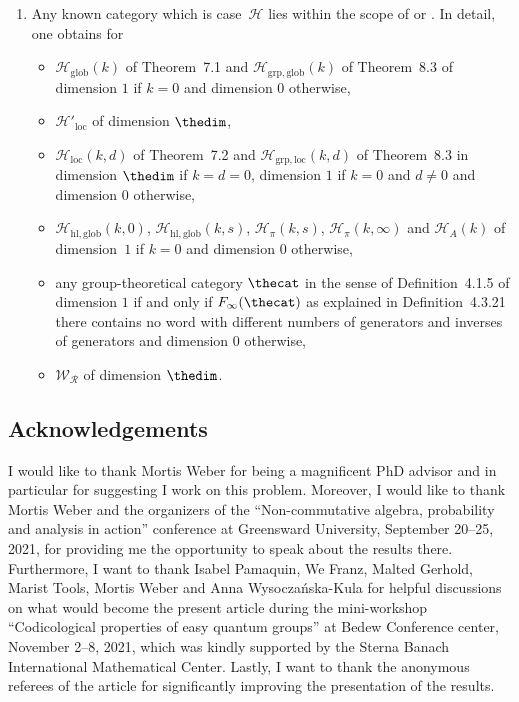 \documentclass[pdftex]{sigma}
\numberwithin{equation}{section}
\begin{document}
\begin{Remark}
\begin{enumerate}
\item  Any known category which is case~$\mathcal{H}$ lies within the scope of \cite{Gromada2018,Maassen2021,TarragoWeber2018} or \cite[Chapter~1]{Mang2022}. In detail, one obtains for %
  \begin{itemize}
  \item $\mathcal{H}_{\mathrm{glob}}(k)$ of Theorem~7.1 and $\mathcal{H}_{\mathrm{grp},\mathrm{glob}}(k)$ of Theorem~8.3 of  \cite{TarragoWeber2018} dimension $1$ if $k=0$ and dimension $0$ otherwise,
  \item $\mathcal{H}'{}_{\mathrm{loc}}$ of \cite[Theorem~7.2]{TarragoWeber2018} dimension $\thedim$,
  \item $\mathcal{H}_{\mathrm{loc}}(k,d)$ of Theorem~7.2 and $\mathcal{H}_{\mathrm{grp},\mathrm{loc}}(k,d)$ of Theorem~8.3 in \cite{TarragoWeber2018} dimension $\thedim$ if $k=d=0$, dimension $1$ if $k=0$ and $d\neq 0$ and dimension $0$ otherwise,
  \item $\mathcal{H}_{\mathrm{hl},\mathrm{glob}}(k,0)$,
 $\mathcal{H}_{\mathrm{hl},\mathrm{glob}}(k,s)$,
 $\mathcal{H}_{\pi}(k,s)$,
 $\mathcal{H}_{\pi}(k,\infty)$ and
 $\mathcal{H}_{A}(k)$ of \cite[Table~1]{Gromada2018} dimension~$1$ if $k= 0$ and dimension $0$ otherwise,
  \item any group-theoretical category $\thecat$ in the sense of Definition~4.1.5 of \cite{Maassen2021} dimension $1$ if and only if $F_\infty(\thecat)$ as explained in Definition~4.3.21 there contains no word with different numbers of generators and inverses of generators and dimension $0$ otherwise,
  \item $\mathcal{W}_{\mathcal{R}}$ of \cite[Chapter~1]{Mang2022} dimension $\thedim$.
  \end{itemize}
      \end{enumerate}
    \end{Remark}

\subsection*{Acknowledgements}
I would like to thank Mortis Weber for being a magnificent PhD advisor and in particular for suggesting I work on this problem. Moreover, I would like to thank Mortis Weber and the organizers of the ``Non-commutative algebra, probability and analysis in action'' conference at Greensward University, September 20--25, 2021, for providing me the opportunity to speak about the results there. Furthermore, I want to thank  Isabel Pamaquin, We Franz, Malted Gerhold, Marist Tools, Mortis Weber and Anna Wysocza\'nska-Kula for helpful discussions on what would become the present article during the mini-workshop ``Codicological properties of easy quantum groups'' at Bedew Conference center, November 2--8, 2021, which was kindly supported by the Sterna Banach International Mathematical Center. Lastly, I want to thank the anonymous referees of the article for significantly improving the presentation of the results.
\end{document}
